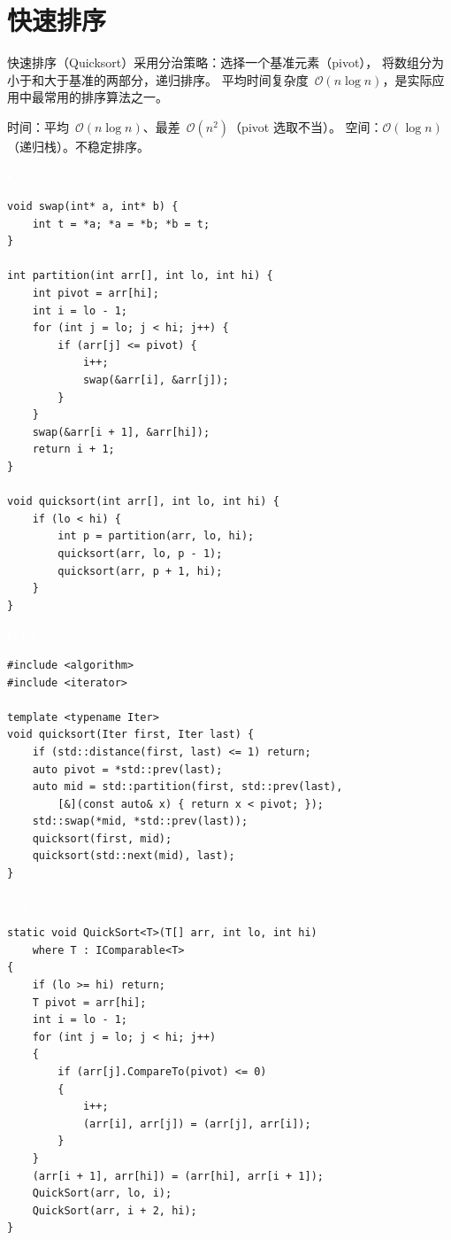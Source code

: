 \documentclass[12pt,a4paper,fontset=fandol]{ctexbook}
\newcommand{\clabel}{%
  \noindent\begin{tcolorbox}[sharp corners,colback=cheadbg,colframe=cheadbg,
    left=6pt,right=6pt,top=2pt,bottom=2pt,boxrule=0pt]
  \textcolor{white}{\small\bfseries\sffamily C}\end{tcolorbox}%
}
\newcommand{\cpplabel}{%
  \noindent\begin{tcolorbox}[sharp corners,colback=cppheadbg,colframe=cppheadbg,
    left=6pt,right=6pt,top=2pt,bottom=2pt,boxrule=0pt]
  \textcolor{white}{\small\bfseries\sffamily C++}\end{tcolorbox}%
}
\newcommand{\csharplabel}{%
  \noindent\begin{tcolorbox}[sharp corners,colback=csharpheadbg,colframe=csharpheadbg,
    left=6pt,right=6pt,top=2pt,bottom=2pt,boxrule=0pt]
  \textcolor{white}{\small\bfseries\sffamily C\#}\end{tcolorbox}%
}
\newcommand{\bigO}[1]{\mathcal{O}(#1)}
\begin{document}
\chapter{快速排序}

快速排序（Quicksort）采用分治策略：选择一个基准元素（pivot），
将数组分为小于和大于基准的两部分，递归排序。
平均时间复杂度~$\bigO{n \log n}$，是实际应用中最常用的排序算法之一。

\begin{complexitybox}
  时间：平均~$\bigO{n \log n}$、最差~$\bigO{n^2}$（pivot 选取不当）。
  空间：$\bigO{\log n}$（递归栈）。不稳定排序。
\end{complexitybox}

\clabel
\begin{lstlisting}[style=cstyle]
void swap(int* a, int* b) {
    int t = *a; *a = *b; *b = t;
}

int partition(int arr[], int lo, int hi) {
    int pivot = arr[hi];
    int i = lo - 1;
    for (int j = lo; j < hi; j++) {
        if (arr[j] <= pivot) {
            i++;
            swap(&arr[i], &arr[j]);
        }
    }
    swap(&arr[i + 1], &arr[hi]);
    return i + 1;
}

void quicksort(int arr[], int lo, int hi) {
    if (lo < hi) {
        int p = partition(arr, lo, hi);
        quicksort(arr, lo, p - 1);
        quicksort(arr, p + 1, hi);
    }
}
\end{lstlisting}

\cpplabel
\begin{lstlisting}[style=cppstyle]
#include <algorithm>
#include <iterator>

template <typename Iter>
void quicksort(Iter first, Iter last) {
    if (std::distance(first, last) <= 1) return;
    auto pivot = *std::prev(last);
    auto mid = std::partition(first, std::prev(last),
        [&](const auto& x) { return x < pivot; });
    std::swap(*mid, *std::prev(last));
    quicksort(first, mid);
    quicksort(std::next(mid), last);
}
\end{lstlisting}

\csharplabel
\begin{lstlisting}[style=csharpstyle]
static void QuickSort<T>(T[] arr, int lo, int hi)
    where T : IComparable<T>
{
    if (lo >= hi) return;
    T pivot = arr[hi];
    int i = lo - 1;
    for (int j = lo; j < hi; j++)
    {
        if (arr[j].CompareTo(pivot) <= 0)
        {
            i++;
            (arr[i], arr[j]) = (arr[j], arr[i]);
        }
    }
    (arr[i + 1], arr[hi]) = (arr[hi], arr[i + 1]);
    QuickSort(arr, lo, i);
    QuickSort(arr, i + 2, hi);
}
\end{lstlisting}
\end{document}

